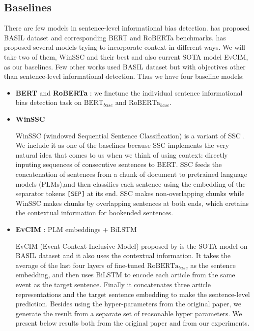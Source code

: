 \subsection{Baselines}

There are few models in sentence-level informational bias detection. \citet{fan-etal-2019-plain} has proposed BASIL dataset and corresponding BERT and RoBERTa benchmarks. \citet{cohan-etal-2019-pretrained} has proposed several models trying to incorporate context in different ways. We will take two of them, WinSSC and their best and also current SOTA model EvCIM, as our baselines. Few other works used BASIL dataset but with objectives other than sentence-level informational detection. Thus we have four baseline models:

\begin{itemize}
    \item \textbf{BERT} \citep{devlin-etal-2019-bert} and \textbf{RoBERTa} \citep{liu2019roberta}: we finetune the individual sentence informational bias detection task on $\text{BERT}_{base}$ and $\text{RoBERTa}_{base}$.
    \item \textbf{WinSSC} \citep{van-den-berg-markert-2020-context}
        
        WinSSC (windowed Sequential Sentence Classification) is a variant of SSC \citep{cohan-etal-2019-pretrained}. We include it as one of the baselines because SSC implements the very natural idea that comes to us when we think of using context: directly inputing sequences of consecutive sentences to BERT. SSC feeds the concatenation of sentences from a chunk of document to pretrained language models (PLMs),and  then classifies each sentence using the embedding of the separator tokens \texttt{[SEP]} at its end. SSC makes non-overlapping chunks while WinSSC makes chunks by overlapping sentences at both ends, which eretains the contextual information for bookended sentences. 
        
    \item \textbf{EvCIM}\label{para:evcim}  : PLM embeddings + BiLSTM
    
        EvCIM (Event Context-Inclusive Model) proposed by \citet{cohan-etal-2019-pretrained} is the SOTA model on BASIL dataset and it also uses the contextual information.
         It takes the average of the last four layers of fine-tuned $\text{RoBERTa}_{base}$ as the sentence embedding, and then uses BiLSTM to encode each article from the same event as the target sentence. Finally it concatenates three article representations and the target sentence embedding to make the sentence-level prediction. Besides using the hyper-parameters from the original paper, we generate the result from a separate set of reasonable hyper parameters. We present below results both from the original paper and from our experiments.
    
\end{itemize}



